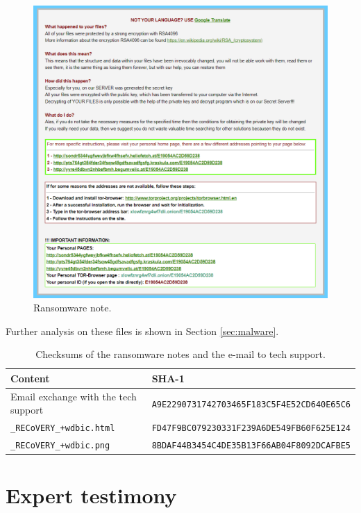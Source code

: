 \documentclass[12pt]{article}
\begin{document}
\begin{figure}[!ht]
    \centering
    \includegraphics[width=\textwidth]{images/recovery_file.png}
    \caption{Ransomware note.}
    \label{fig:rec-file}
\end{figure}
Further analysis on these files is shown in Section \ref{sec:malware}.

\begin{table}[!ht]
    \centering
    \begin{tabular}{ll}
    \toprule
    \textbf{Content} & \textbf{SHA-1} \\
    \midrule
    Email exchange with the tech support & \texttt{A9E2290731742703465F183C5F4E52CD640E65C6} \\
    \texttt{\_RECoVERY\_+wdbic.html} & \texttt{FD47F9BC079230331F239A6DE549FB60F625E124} \\
    \texttt{\_RECoVERY\_+wdbic.png} & \texttt{8BDAF44B3454C4DE35B13F66AB04F8092DCAFBE5} \\
    \bottomrule
    \end{tabular}
    \caption{Checksums of the ransomware notes and the e-mail to tech support.}
    \label{table:sha1-malware-info}
\end{table}

\section{Expert testimony}
\end{document}
